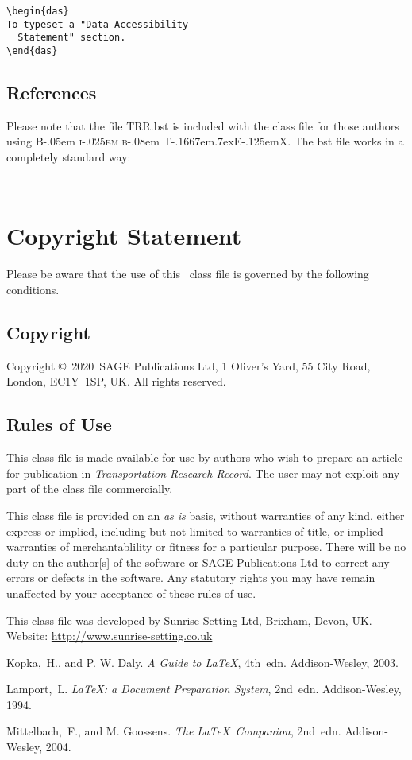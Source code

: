 \documentclass[times]{TRR}
\newcommand\BibTeX{{\rmfamily B\kern-.05em \textsc{i\kern-.025em b}\kern-.08em
T\kern-.1667em\lower.7ex\hbox{E}\kern-.125emX}}
\def\volumeyear{2020}
\begin{document}
\begin{verbatim}
\begin{das}
To typeset a "Data Accessibility
  Statement" section.
\end{das}
\end{verbatim}

\subsection{References}
Please note that the file \textsf{TRR.bst} is included with the class file
for those authors using \BibTeX.
The bst file works in a completely standard way:
\begin{verbatim}


\end{verbatim}

\section{Copyright Statement}
Please  be  aware that the use of  this \LaTeXe\ class file is
governed by the following conditions.

\subsection{Copyright}
Copyright \copyright\ \volumeyear\ SAGE Publications Ltd,
1 Oliver's Yard, 55 City Road, London, EC1Y~1SP, UK. All
rights reserved.

\subsection{Rules of Use}
This class file is made available for use by authors who wish to
prepare an article for publication in \textit{Transportation Research Record}.
The user may not exploit any
part of the class file commercially.

This class file is provided on an \textit{as is}  basis, without
warranties of any kind, either express or implied, including but
not limited to warranties of title, or implied  warranties of
merchantablility or fitness for a particular purpose. There will
be no duty on the author[s] of the software or SAGE Publications Ltd
to correct any errors or defects in the software. Any
statutory  rights you may have remain unaffected by your
acceptance of these rules of use.

\begin{acks}
This class file was developed by Sunrise Setting Ltd,
Brixham, Devon, UK.\\
Website: \url{http://www.sunrise-setting.co.uk}
\end{acks}

\begin{thebibliography}{99}
Kopka,~H., and P. W. Daly. \textit{A Guide to \LaTeX}, 4th~edn.
Addison-Wesley, 2003.

Lamport,~L. \textit{\LaTeX: a Document Preparation System},
2nd~edn. Addison-Wesley, 1994.

Mittelbach,~F., and M. Goossens. \textit{The \LaTeX\ Companion},
2nd~edn. Addison-Wesley, 2004.

\end{thebibliography}
\end{document}
